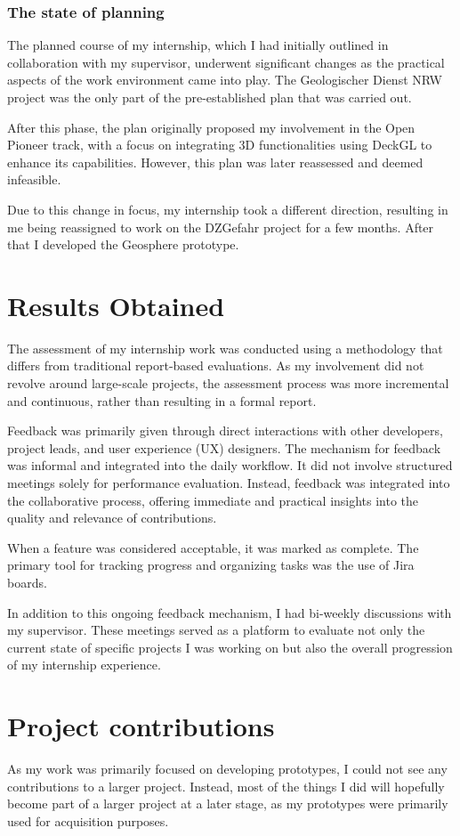 \documentclass[11pt, titlepage, a4paper]{article}
\begin{document}
\subsubsection{The state of planning}
The planned course of my internship, which I had initially outlined in collaboration with my supervisor, underwent significant changes as the practical aspects of the work environment came into play. The Geologischer Dienst NRW project was the only part of the pre-established plan that was carried out.

After this phase, the plan originally proposed my involvement in the Open Pioneer track, with a focus on integrating 3D functionalities using DeckGL to enhance its capabilities. However, this plan was later reassessed and deemed infeasible. 

Due to this change in focus, my internship took a different direction, resulting in me being reassigned to work on the DZGefahr project for a few months. After that I developed the Geosphere prototype.


\section{Results Obtained}
The assessment of my internship work was conducted using a methodology that differs from traditional report-based evaluations. As my involvement did not revolve around large-scale projects, the assessment process was more incremental and continuous, rather than resulting in a formal report.

Feedback was primarily given through direct interactions with other developers, project leads, and user experience (UX) designers. The mechanism for feedback was informal and integrated into the daily workflow. It did not involve structured meetings solely for performance evaluation. Instead, feedback was integrated into the collaborative process, offering immediate and practical insights into the quality and relevance of contributions.

When a feature was considered acceptable, it was marked as complete. The primary tool for tracking progress and organizing tasks was the use of Jira boards.

In addition to this ongoing feedback mechanism, I had bi-weekly discussions with my supervisor. These meetings served as a platform to evaluate not only the current state of specific projects I was working on but also the overall progression of my internship experience.

\section{Project contributions}
As my work was primarily focused on developing prototypes, I could not see any contributions to a larger project. Instead, most of the things I did will hopefully become part of a larger project at a later stage, as my prototypes were primarily used for acquisition purposes.
\end{document}
